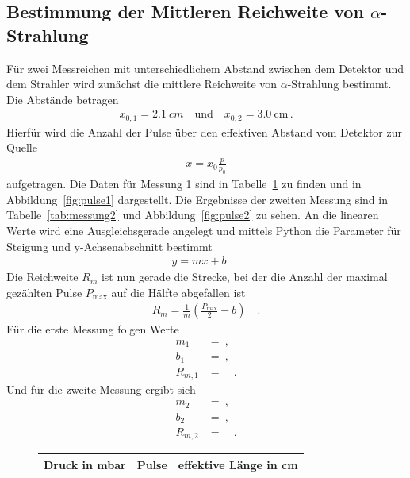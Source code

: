 \subsection{Bestimmung der Mittleren Reichweite von $\alpha$-Strahlung} \label{sec:reichweite}
Für zwei Messreichen mit unterschiedlichem Abstand zwischen dem Detektor und dem Strahler wird zunächst die mittlere Reichweite von $\alpha$-Strahlung bestimmt. Die Abstände betragen
\begin{align*}
	x_{0,1} = \SI{2,1}{cm} \quad \text{und} \quad x_{0,2} = \SI{3,0}{\centi\meter} \, .
\end{align*}
Hierfür wird die Anzahl der Pulse über den effektiven Abstand vom Detektor zur Quelle
\begin{align}
	x = x_0 \frac{p}{p_0}
\end{align}
aufgetragen. Die Daten für Messung 1 sind in Tabelle~\ref{tab:messung1} zu finden und in Abbildung~\ref{fig:pulse1} dargestellt. Die Ergebnisse der zweiten Messung sind in Tabelle~\ref{tab:messung2} und Abbildung~\ref{fig:pulse2} zu sehen.  An die linearen Werte wird eine Ausgleichsgerade angelegt und mittels Python die Parameter für Steigung und y-Achsenabschnitt bestimmt
\begin{align}
	y = mx +b \quad .
\end{align}
Die Reichweite $R_m$ ist nun gerade die Strecke, bei der die Anzahl der maximal gezählten Pulse $P_\text{max}$  auf die Hälfte abgefallen ist
\begin{align}
	R_m = \frac{1}{m} \left(\frac{P_\text{max}}{2} -b \right) \quad .
\end{align}
Für die erste Messung folgen Werte
\begin{align}
	m_1 &=  \ , \\
	b_1 &=  \ , \\
	R_{m,1} &=  \quad.
\end{align}
Und für die zweite Messung ergibt sich
\begin{align}
	m_2 &=  \ , \\
	b_2 &=  \ , \\
	R_{m,2} &=  \quad.
\end{align}

\clearpage

 \begin{figure}[h!]
 	\centering
 	\begin{tabular}{c|c|c}
 		Druck in \si{\milli\bar} & Pulse & effektive Länge in \si{cm} \\
 		\hline
 		
 	\end{tabular}
 	\label{tab:messung1}
 \end{figure}

